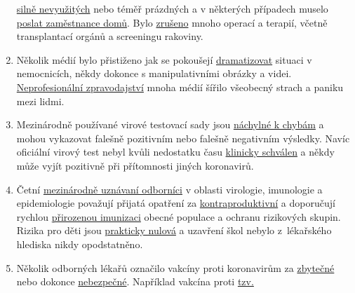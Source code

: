\begin{enumerate}
  \href{https://www.hsj.co.uk/acute-care/nhs-hospitals-have-four-times-more-empty-beds-than-normal/7027392.article}{silně
  nevyužitých} nebo téměř prázdných a v některých případech muselo
  \href{https://www.usatoday.com/story/news/health/2020/04/02/coronavirus-pandemic-jobs-us-health-care-workers-furloughed-laid-off/5102320002/}{poslat
  zaměstnance domů}. Bylo
  \href{https://www.sfchronicle.com/bayarea/article/Stanford-hospital-system-to-cut-pay-20-furlough-15227591.php}{zrušeno}
  mnoho operací a terapií, včetně transplantací orgánů a screeningu
  rakoviny.
\item
  Několik médií bylo přistiženo jak se pokoušejí
  \href{https://nypost.com/2020/04/01/cbs-admits-to-using-footage-from-italy-in-report-about-nyc/}{dramatizovat}
  situaci v nemocnicích, někdy dokonce s manipulativními obrázky a
  videi.
  \href{https://onlinelibrary.wiley.com/doi/full/10.1111/eci.13222}{Neprofesionální
  zpravodajství} mnoha médií šířilo všeobecný strach a paniku mezi
  lidmi.
\item
  Mezinárodně používané virové testovací sady jsou
  \href{https://www.ncbi.nlm.nih.gov/pubmed/32219885}{náchylné k chybám}
  a mohou vykazovat falešně pozitivním nebo falešně negativním výsledky.
  Navíc oficiální virový test nebyl kvůli nedostatku času
  \href{https://www.youtube.com/watch?v=p_AyuhbnPOI}{klinicky schválen}
  a někdy může vyjít pozitivně při přítomnosti jiných koronavirů.
\item
  Četní
  \href{https://off-guardian.org/2020/03/24/12-experts-questioning-the-coronavirus-panic/}{mezinárodně
  uznávaní odborníci} v oblasti virologie, imunologie a epidemiologie
  považují přijatá opatření za
  \href{https://off-guardian.org/2020/03/28/10-more-experts-criticising-the-coronavirus-panic/}{kontraproduktivní}
  a doporučují rychlou
  \href{https://off-guardian.org/2020/04/17/8-more-experts-questioning-the-coronavirus-panic/}{přirozenou
  imunizaci} obecné populace a ochranu rizikových skupin. Rizika pro
  děti jsou
  \href{https://www.thelancet.com/journals/lanchi/article/PIIS2352-4642(20)30095-X/fulltext}{prakticky
  nulová} a uzavření škol nebylo z~lékařského hlediska nikdy
  opodstatněno.
\item
  Několik odborných lékařů označilo vakcíny proti koronavirům za
  \href{https://www.youtube.com/watch?v=vrL9QKGQrWk}{zbytečné} nebo
  dokonce
  \href{https://www.nature.com/articles/d41586-020-00751-9}{nebezpečné}.
  Například vakcína proti
  \href{https://www.forbes.com/2010/02/05/world-health-organization-swine-flu-pandemic-opinions-contributors-michael-fumento.html\#658c006c48e8}{tzv.
}
\end{enumerate}
